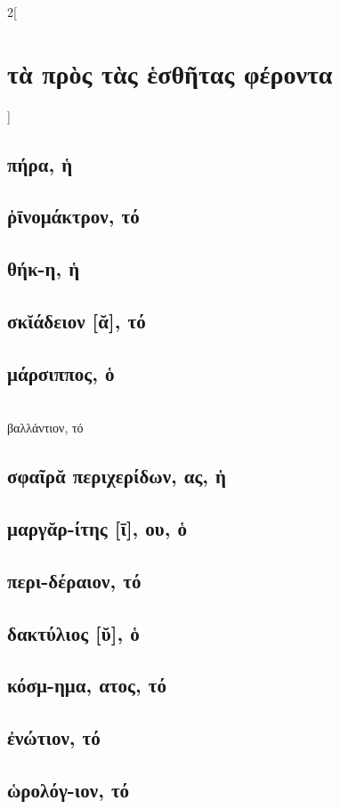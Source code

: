\documentclass{book}
\begin{document}
\begin{multicols}{2}[\section{τὰ πρὸς τὰς ἑσθῆτας φέροντα}]
\subsection{πήρα, ἡ}          
\subsection{ῥῑνομάκτρον, τό}
\subsection{θήκ-η, ἡ}
\subsection{σκῐάδειον [ᾰ], τό}
\subsection{μάρσιππος, ὁ}  ~\\
βαλλάντιον, τό 
\subsection{σφαῖρᾰ περιχερίδων, ας, ἡ}         
\subsection{μαργᾰρ-ίτης [ῑ], ου, ὁ}
\subsection{περι-δέραιον, τό} 
\subsection{δακτύλιος [ῠ], ὁ}
\subsection{κόσμ-ημα, ατος, τό}
\subsection{ἐνώτιον, τό}
\subsection{ὡρολόγ-ιον, τό}

\end{multicols}
\end{document}
